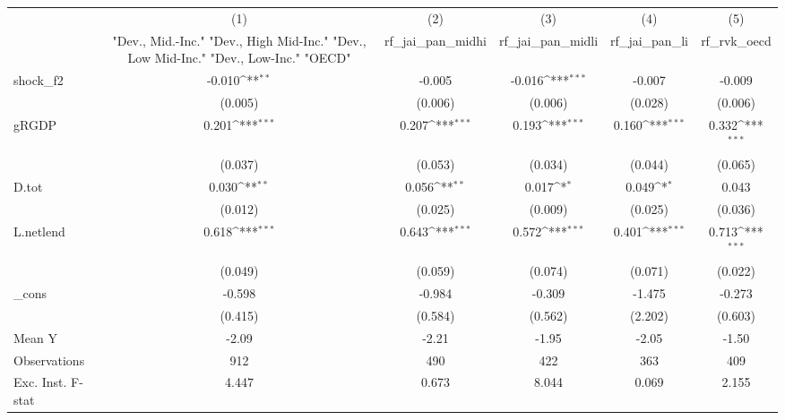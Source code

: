 {
\def\sym#1{\ifmmode^{#1}\else\(^{#1}\)\fi}
\begin{tabular}{l*{5}{c}}
\toprule
            &\multicolumn{1}{c}{(1)}&\multicolumn{1}{c}{(2)}&\multicolumn{1}{c}{(3)}&\multicolumn{1}{c}{(4)}&\multicolumn{1}{c}{(5)}\\
            &\multicolumn{1}{c}{ "Dev., Mid.-Inc." "Dev., High Mid-Inc." "Dev., Low Mid-Inc." "Dev., Low-Inc." "OECD" }&\multicolumn{1}{c}{rf\_jai\_pan\_midhi}&\multicolumn{1}{c}{rf\_jai\_pan\_midli}&\multicolumn{1}{c}{rf\_jai\_pan\_li}&\multicolumn{1}{c}{rf\_rvk\_oecd}\\
\midrule
shock\_f2    &      -0.010\sym{**} &      -0.005         &      -0.016\sym{***}&      -0.007         &      -0.009         \\
            &     (0.005)         &     (0.006)         &     (0.006)         &     (0.028)         &     (0.006)         \\
\addlinespace
gRGDP       &       0.201\sym{***}&       0.207\sym{***}&       0.193\sym{***}&       0.160\sym{***}&       0.332\sym{***}\\
            &     (0.037)         &     (0.053)         &     (0.034)         &     (0.044)         &     (0.065)         \\
\addlinespace
D.tot       &       0.030\sym{**} &       0.056\sym{**} &       0.017\sym{*}  &       0.049\sym{*}  &       0.043         \\
            &     (0.012)         &     (0.025)         &     (0.009)         &     (0.025)         &     (0.036)         \\
\addlinespace
L.netlend   &       0.618\sym{***}&       0.643\sym{***}&       0.572\sym{***}&       0.401\sym{***}&       0.713\sym{***}\\
            &     (0.049)         &     (0.059)         &     (0.074)         &     (0.071)         &     (0.022)         \\
\addlinespace
\_cons      &      -0.598         &      -0.984         &      -0.309         &      -1.475         &      -0.273         \\
            &     (0.415)         &     (0.584)         &     (0.562)         &     (2.202)         &     (0.603)         \\
\midrule
Mean Y      &       -2.09         &       -2.21         &       -1.95         &       -2.05         &       -1.50         \\
Observations&         912         &         490         &         422         &         363         &         409         \\
Exc. Inst. F-stat&       4.447         &       0.673         &       8.044         &       0.069         &       2.155         \\
\bottomrule
\end{tabular}
}

